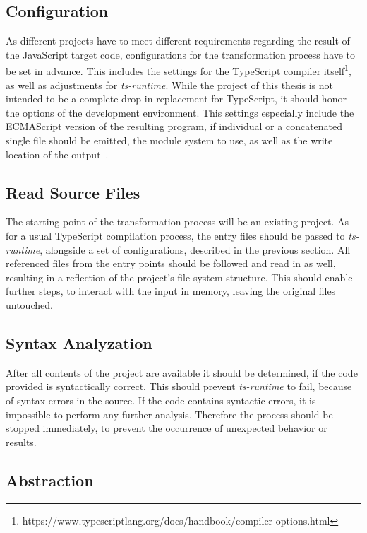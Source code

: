 \subsection{Configuration}
\label{sec:steps-configuration}

As different projects have to meet different requirements regarding the result of the JavaScript target code, configurations for the transformation process have to be set in advance. This includes the settings for the TypeScript compiler itself\footnote{https://www.typescriptlang.org/docs/handbook/compiler-options.html}, as well as adjustments for \emph{ts-runtime}. While the project of this thesis is not intended to be a complete drop-in replacement for TypeScript, it should honor the options of the development environment. This settings especially include the ECMAScript version of the resulting program, if individual or a concatenated single file should be emitted, the module system to use, as well as the write location of the output~\cite{TypeScriptHandbook:CompilerOptions}.

\subsection{Read Source Files}

The starting point of the transformation process will be an existing project. As for a usual TypeScript compilation process, the entry files should be passed to \emph{ts-runtime}, alongside a set of configurations, described in the previous section. All referenced files from the entry points should be followed and read in as well, resulting in a reflection of the project's file system structure. This should enable further steps, to interact with the input in memory, leaving the original files untouched.

\subsection{Syntax Analyzation}

After all contents of the project are available it should be determined, if the code provided is syntactically correct. This should prevent \emph{ts-runtime} to fail, because of syntax errors in the source. If the code contains syntactic errors, it is impossible to perform any further analysis. Therefore the process should be stopped immediately, to prevent the occurrence of unexpected behavior or results.

\subsection{Abstraction}

